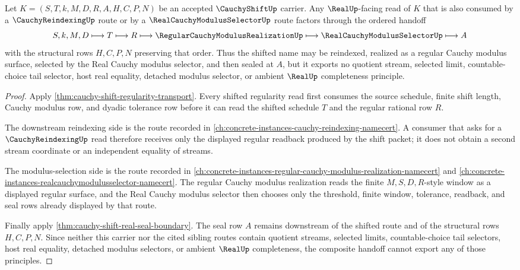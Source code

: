 \begin{theorem}
\label{thm:cauchy-shift-reindexing-selector-handoff}
Let $K=(S,T,k,M,D,R,A,H,C,P,N)$ be an accepted $\CauchyShiftUp$ carrier. Any $\RealUp$-facing read of $K$ that is also consumed by a $\CauchyReindexingUp$ route or by a $\RealCauchyModulusSelectorUp$ route factors through the ordered handoff
$$
S,k,M,D \longmapsto T \longmapsto R \longmapsto \RegularCauchyModulusRealizationUp \longmapsto \RealCauchyModulusSelectorUp \longmapsto A
$$
with the structural rows $H,C,P,N$ preserving that order. Thus the shifted name may be reindexed, realized as a regular Cauchy modulus surface, selected by the Real Cauchy modulus selector, and then sealed at $A$, but it exports no quotient stream, selected limit, countable-choice tail selector, host real equality, detached modulus selector, or ambient $\RealUp$ completeness principle.
\end{theorem}
\begin{proof}
Apply \autoref{thm:cauchy-shift-regularity-transport}. Every shifted regularity read first consumes the source schedule, finite shift length, Cauchy modulus row, and dyadic tolerance row before it can read the shifted schedule $T$ and the regular rational row $R$.

The downstream reindexing side is the route recorded in \autoref{ch:concrete-instances-cauchy-reindexing-namecert}. A consumer that asks for a $\CauchyReindexingUp$ read therefore receives only the displayed regular readback produced by the shift packet; it does not obtain a second stream coordinate or an independent equality of streams.

The modulus-selection side is the route recorded in \autoref{ch:concrete-instances-regular-cauchy-modulus-realization-namecert} and \autoref{ch:concrete-instances-realcauchymodulusselector-namecert}. The regular Cauchy modulus realization reads the finite $M,S,D,R$-style window as a displayed regular surface, and the Real Cauchy modulus selector then chooses only the threshold, finite window, tolerance, readback, and seal rows already displayed by that route.

Finally apply \autoref{thm:cauchy-shift-real-seal-boundary}. The seal row $A$ remains downstream of the shifted route and of the structural rows $H,C,P,N$. Since neither this carrier nor the cited sibling routes contain quotient streams, selected limits, countable-choice tail selectors, host real equality, detached modulus selectors, or ambient $\RealUp$ completeness, the composite handoff cannot export any of those principles.
\end{proof}

